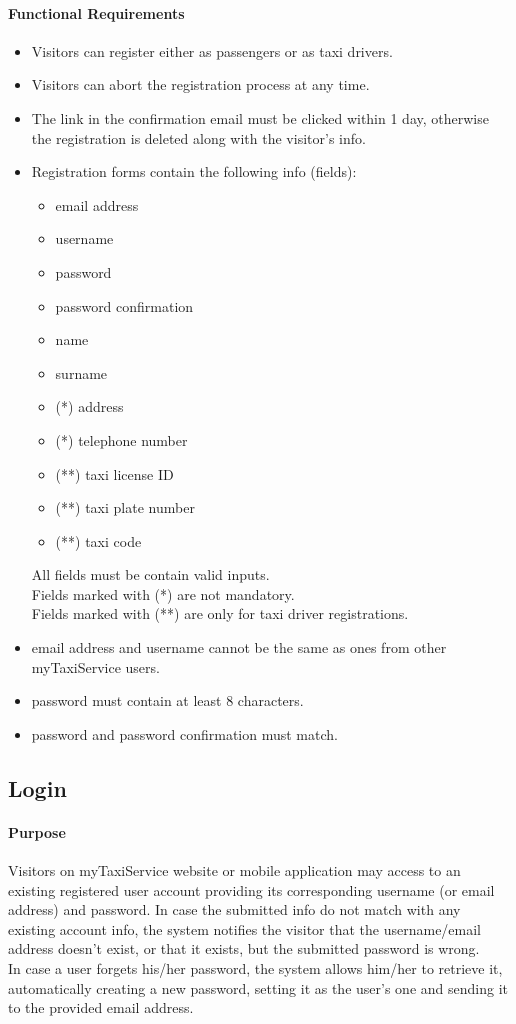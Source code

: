 \paragraph{Functional Requirements}
\begin{itemize}
	
	\item Visitors can register either as passengers or as taxi drivers.	
	\item Visitors can abort the registration process at any time.	
	\item The link in the confirmation email must be clicked within 1 day, otherwise the registration is deleted along with the visitor's info.	
	\item Registration forms contain the following info (fields):
	\begin{itemize}
		\item email address
		\item username
		\item password
		\item password confirmation
		\item name
		\item surname
		\item (*) address
		\item (*) telephone number
		\item (**) taxi license ID
		\item (**) taxi plate number
		\item (**) taxi code
	\end{itemize}
	All fields must be contain valid inputs.\\
	Fields marked with (*) are not mandatory.\\
	Fields marked with (**) are only for taxi driver registrations.	
	\item email address and username cannot be the same as ones from other myTaxiService users.	
	\item password must contain at least 8 characters.	
	\item password and password confirmation must match.	
\end{itemize}

\subsection{Login}

\paragraph{Purpose}
Visitors on myTaxiService website or mobile application may access to an existing registered user account providing its corresponding username (or email address) and password. In case the submitted info do not match with any existing account info, the system notifies the visitor that the username/email address doesn't exist, or that it exists, but the submitted password is wrong.\\
In case a user forgets his/her password, the system allows him/her to retrieve it, automatically creating a new password, setting it as the user's one and sending it to the provided email address.

